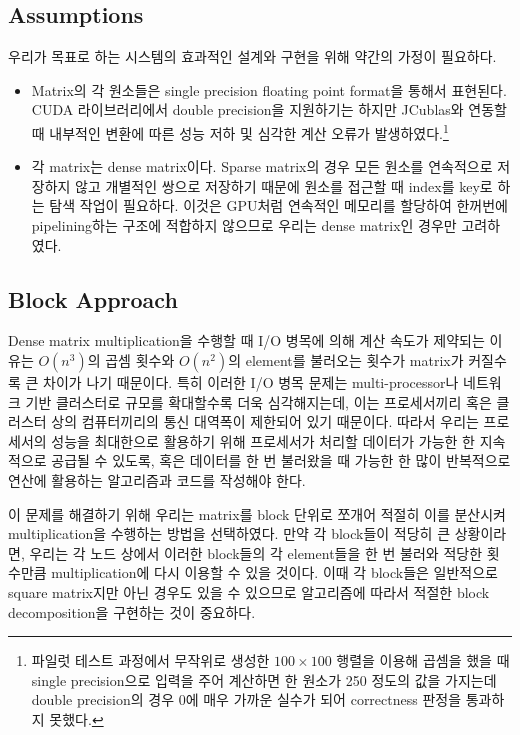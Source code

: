 \documentclass[a4paper]{article}
\begin{document}
\begin{multicols}{2}
\subsection{Assumptions}
우리가 목표로 하는 시스템의 효과적인 설계와 구현을 위해 약간의 가정이 필요하다.
\begin{itemize}
	\item Matrix의 각 원소들은 single precision floating point format을 통해서 표현된다. CUDA 라이브러리에서 double precision을 지원하기는 하지만 JCublas와 연동할 때 내부적인 변환에 따른 성능 저하 및 심각한 계산 오류가 발생하였다.\footnote{파일럿 테스트 과정에서 무작위로 생성한 $100 \times 100$ 행렬을 이용해 곱셈을 했을 때 single precision으로 입력을 주어 계산하면 한 원소가 250 정도의 값을 가지는데 double precision의 경우 0에 매우 가까운 실수가 되어 correctness 판정을 통과하지 못했다.}
	\item 각 matrix는 dense matrix이다. Sparse matrix의 경우 모든 원소를 연속적으로 저장하지 않고 개별적인 쌍으로 저장하기 때문에 원소를 접근할 때 index를 key로 하는 탐색 작업이 필요하다. 이것은 GPU처럼 연속적인 메모리를 할당하여 한꺼번에 pipelining하는 구조에 적합하지 않으므로 우리는 dense matrix인 경우만 고려하였다.
\end{itemize}

\subsection{Block Approach}
Dense matrix multiplication을 수행할 때 I/O 병목에 의해 계산 속도가 제약되는 이유는 $O(n^3)$의 곱셈 횟수와 $O(n^2)$의 element를 불러오는 횟수가 matrix가 커질수록 큰 차이가 나기 때문이다.
특히 이러한 I/O 병목 문제는 multi-processor나 네트워크 기반 클러스터로 규모를 확대할수록 더욱 심각해지는데, 이는 프로세서끼리 혹은 클러스터 상의 컴퓨터끼리의 통신 대역폭이 제한되어 있기 때문이다.
따라서 우리는 프로세서의 성능을 최대한으로 활용하기 위해 프로세서가 처리할 데이터가 가능한 한 지속적으로 공급될 수 있도록, 혹은 데이터를 한 번 불러왔을 때 가능한 한 많이 반복적으로 연산에 활용하는 알고리즘과 코드를 작성해야 한다.

이 문제를 해결하기 위해 우리는 matrix를 block 단위로 쪼개어 적절히 이를 분산시켜 multiplication을 수행하는 방법을 선택하였다.
만약 각 block들이 적당히 큰 상황이라면, 우리는 각 노드 상에서 이러한 block들의 각 element들을 한 번 불러와 적당한 횟수만큼 multiplication에 다시 이용할 수 있을 것이다.
이때 각 block들은 일반적으로 square matrix지만 아닌 경우도 있을 수 있으므로 알고리즘에 따라서 적절한 block decomposition을 구현하는 것이 중요하다.


\end{multicols}
\end{document}

